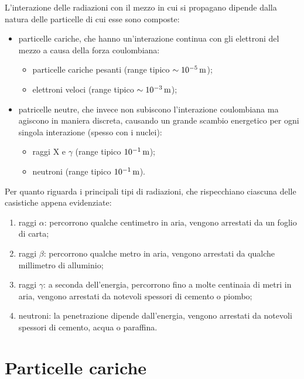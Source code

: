 
L'interazione delle radiazioni con il mezzo in cui si propagano dipende dalla natura delle particelle di cui esse sono composte:
\begin{itemize}
	\item particelle cariche, che hanno un'interazione continua con gli elettroni del mezzo a causa della forza coulombiana:
	\begin{itemize}
		\item particelle cariche pesanti (range tipico $ \sim 10^{-5} \,\mathrm{m} $);
		\item elettroni veloci (range tipico $ \sim 10^{-3} \,\mathrm{m} $);
	\end{itemize}
	\item patricelle neutre, che invece non subiscono l'interazione coulombiana ma agiscono in maniera discreta, causando un grande scambio energetico per ogni singola interazione (spesso con i nuclei):
	\begin{itemize}
		\item raggi X e $ \gamma $ (range tipico $ 10^{-1} \,\mathrm{m} $);
		\item neutroni (range tipico $ 10^{-1} \,\mathrm{m} $).
	\end{itemize}
\end{itemize}
Per quanto riguarda i principali tipi di radiazioni, che rispecchiano ciascuna delle casistiche appena evidenziate:
\begin{enumerate}
	\item raggi $ \alpha $: percorrono qualche centimetro in aria, vengono arrestati da un foglio di carta;
	\item raggi $ \beta $: percorrono qualche metro in aria, vengono arrestati da qualche millimetro di alluminio;
	\item raggi $ \gamma $: a seconda dell'energia, percorrono fino a molte centinaia di metri in aria, vengono arrestati da notevoli spessori di cemento o piombo;
	\item neutroni: la penetrazione dipende dall'energia, vengono arrestati da notevoli spessori di cemento, acqua o paraffina.
\end{enumerate}

\section{Particelle cariche}

